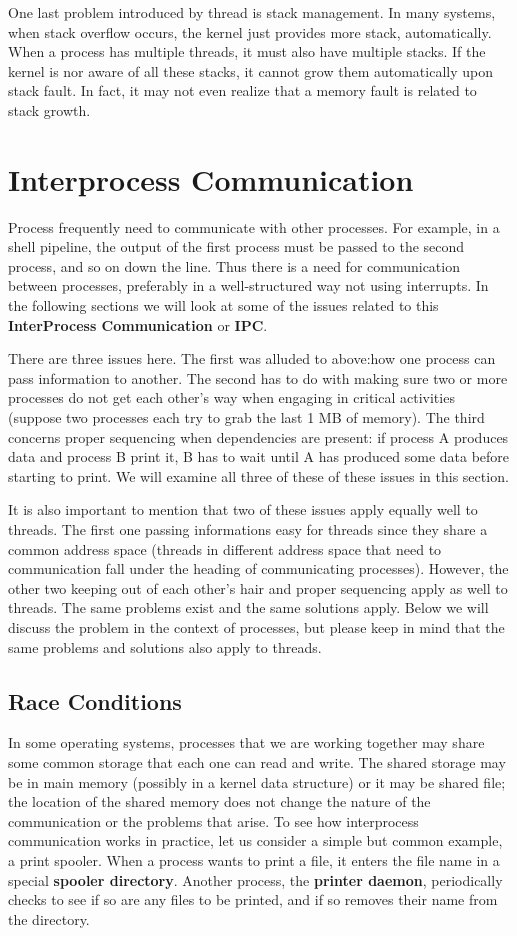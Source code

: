 \documentclass{book}
\newcommand {\kw}  [1] {\textbf{#1}}
\begin{document}
One last problem introduced by thread is stack management.
In many systems, when stack overflow occurs, the kernel just provides more stack, automatically.
When a process has multiple threads, it must also have multiple stacks.
If the kernel is nor aware of all these stacks, it cannot grow them automatically upon stack fault.
In fact, it may not even realize that a memory fault is related to stack growth.
 
\section{Interprocess Communication}
Process frequently need to communicate with other processes.
For example, in a shell pipeline, the output of the first process must be passed to the second process, and so on down the line.
Thus there is a need for communication between processes, 
preferably in a well-structured way not using interrupts.
In the following sections we will look at some of the issues related to this \kw{InterProcess Communication} or \kw{IPC}.

There are three issues here.
The first was alluded to above:how one process can pass information to another.
The second has to do with making sure two or more processes do not get each other's way 
when engaging in critical activities (suppose two processes each try to grab the last 1 MB of memory).
The third concerns proper sequencing when dependencies are present: if process A produces data and process B print it, 
B has to wait until A has produced some data before starting to print.
We will examine all three of these of these issues in this section.

It is also important to mention that two of these issues apply equally well to threads.
The first one passing informations easy for threads since they share a common address space 
(threads in different address space that need to communication fall under the heading of communicating processes).
However, the other two keeping out of each other's hair and proper sequencing apply as well to threads.
The same problems exist and the same solutions apply.
Below we will discuss the problem in the context of processes,
but please keep in mind that the same problems and solutions also apply to threads.

\subsection{Race Conditions}
In some operating systems, processes that we are working together may share some common storage
that each one can read and write.
The shared storage may be in main memory (possibly in a kernel data structure) or it may be shared file;
the location of the shared memory does not change the nature of the communication or the problems that arise.
To see how interprocess communication works in practice, let us consider a simple but common example, a print spooler.
When a process wants to print a file, it enters the file name in a special \kw{spooler directory}.
Another process, the \kw{printer daemon}, periodically checks to see if so are any files to be printed,
and if so removes their name from the directory.
\end{document}
